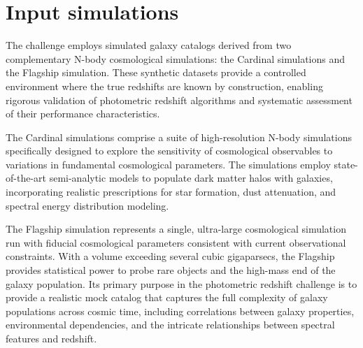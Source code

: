 \documentclass[modern]{desc-tex/styles/lsstdescnote}
\begin{document}







\appendix

\section{Input simulations}

The challenge employs simulated galaxy catalogs derived from two
complementary N-body cosmological simulations: the Cardinal
simulations and the Flagship simulation. These synthetic datasets
provide a controlled environment where the true redshifts are known by
construction, enabling rigorous validation of photometric redshift
algorithms and systematic assessment of their performance
characteristics.

The Cardinal simulations comprise a suite of high-resolution N-body
simulations specifically designed to explore the sensitivity of
cosmological observables to variations in fundamental cosmological
parameters.   The simulations employ state-of-the-art semi-analytic
models to populate dark matter halos with galaxies, incorporating
realistic prescriptions for star formation, dust attenuation, and
spectral energy distribution modeling.

The Flagship simulation represents a single, ultra-large cosmological
simulation run with fiducial cosmological parameters consistent with
current observational constraints. With a volume exceeding several
cubic gigaparsecs, the Flagship provides statistical power to probe
rare objects and the high-mass end of the galaxy population. Its
primary purpose in the photometric redshift challenge is to provide a
realistic mock catalog that captures the full complexity of galaxy
populations across cosmic time, including correlations between galaxy
properties, environmental dependencies, and the intricate
relationships between spectral features and redshift.
\end{document}
